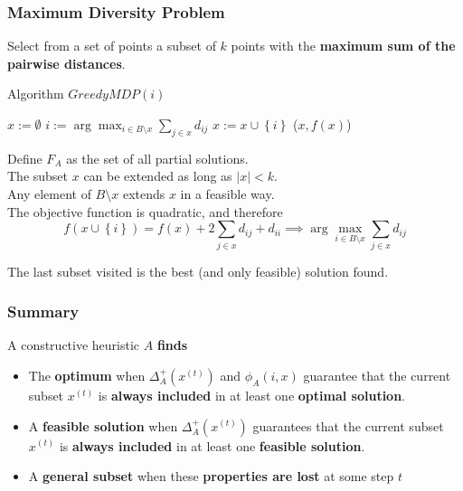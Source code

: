 \documentclass[11pt]{article}
\begin{document}
	\newpage
	
	\subsubsection{Maximum Diversity Problem}
	Select from a set of points a subset of $k$ points with the \textbf{maximum sum of the pairwise distances}.\\
	
	\begin{algorithm}
		\caption{Algorithm $GreedyMDP(i)$}
		\begin{algorithmic}
			\STATE $x := \emptyset$
				\STATE $i := \arg \max_{i \in B \setminus x} \sum_{j \in x} d_{ij}$
				\STATE $x := x \cup \left\{i\right\}$
			\ENDWHILE
			\RETURN ($x, f(x)$)
		\end{algorithmic}
	\end{algorithm}
	
	Define $F_A$ as the set of all partial solutions.\\
	
	The subset $x$ can be extended as long as $|x| < k$.\\
	
	Any element of $B \setminus x$ extends $x$ in a feasible way.\\
	
	The objective function is quadratic, and therefore
	$$ f(x \cup \left\{i\right\}) = f(x) + 2 \sum_{j \in x} d_{ij} + d_{ii} \implies \arg \max_{i \in B \setminus x} \sum_{j \in x} d_{ij} $$
	
	The last subset visited is the best (and only feasible) solution found.\\
	
	\newpage
	
	\subsubsection{Summary}
	A constructive heuristic $A$ \textbf{finds}
	\begin{itemize}
		\item The \textbf{optimum} when $\Delta_A^+ \left(x^{(t)}\right)$ and $\phi_A (i, x)$ guarantee that the current subset $x^{(t)}$ is \textbf{always included} in at least one \textbf{optimal solution}.\\
		
		\item A \textbf{feasible solution} when $\Delta_A^+ \left(x^{(t)}\right)$ guarantees that the current subset $x^{(t)}$ is \textbf{always included} in at least one \textbf{feasible solution}.\\
		
		\item A \textbf{general subset} when these \textbf{properties are lost} at some step $t$
	\end{itemize}
	
\end{document}
